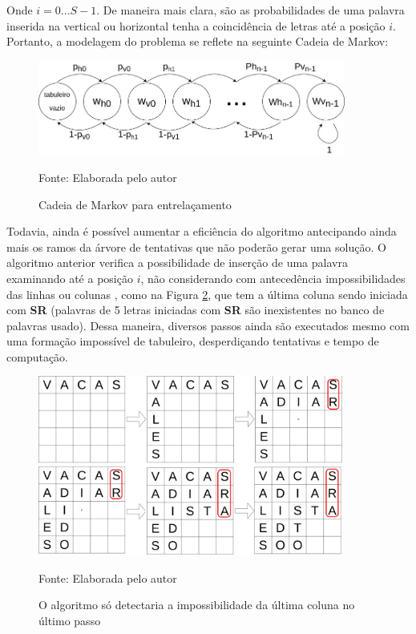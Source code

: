 Onde $i = 0...S-1$. De maneira mais clara, são as probabilidades de uma palavra inserida na vertical ou horizontal tenha a coincidência de letras até a posição $i$. Portanto, a modelagem do problema se reflete na seguinte Cadeia de Markov:

\begin{figure}[H]
\centering
    \caption{Cadeia de Markov para entrelaçamento}
    \label{fig:markov1}
    \includegraphics[width=0.9\textwidth]{Figuras/markovChain1.jpg}
    
    Fonte: Elaborada pelo autor
\end{figure}



Todavia, ainda é possível aumentar a eficiência do algoritmo antecipando ainda mais os ramos da árvore de tentativas que não poderão gerar uma solução. O algoritmo anterior verifica a possibilidade de inserção de uma palavra examinando até a posição $i$, não considerando com antecedência impossibilidades das linhas ou colunas , como na Figura \ref{fig:scaffolding}, que tem a última coluna sendo iniciada com \textbf{SR} (palavras de 5 letras iniciadas com \textbf{SR} são inexistentes no banco de palavras usado). Dessa maneira, diversos passos ainda são executados mesmo com uma formação impossível de tabuleiro, desperdiçando tentativas e tempo de computação.


\begin{figure}[H]
\centering
    \caption{O algoritmo só detectaria a impossibilidade da última coluna no último passo}
    \label{fig:scaffolding}
    \includegraphics[width=0.9\textwidth]{Figuras/bradingerror.jpg}
    
    Fonte: Elaborada pelo autor
\end{figure}

